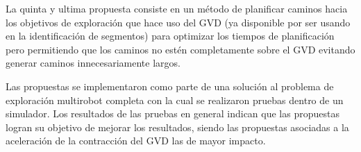 La quinta y ultima propuesta consiste en un método de planificar caminos hacia
los objetivos de exploración que hace uso del GVD (ya disponible por ser usando
en la identificación de segmentos) para optimizar los tiempos de planificación
pero permitiendo que los caminos no estén completamente sobre el GVD evitando
generar caminos innecesariamente largos.

Las propuestas se implementaron como parte de una solución al problema de
exploración multirobot completa con la cual se realizaron pruebas dentro de un
simulador. Los resultados de las pruebas en general indican que las propuestas
logran su objetivo de mejorar los resultados, siendo las propuestas asociadas a
la aceleración de la contracción del GVD las de mayor impacto.
